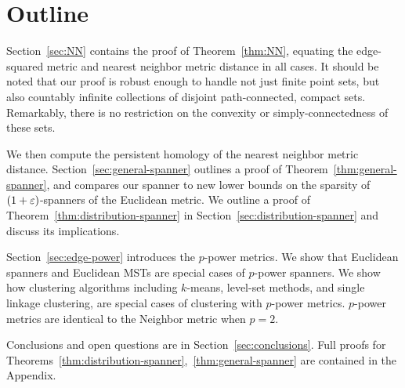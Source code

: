 \section{Outline}
%  
Section~\ref{sec:NN} contains the proof of Theorem~\ref{thm:NN},
equating the edge-squared metric and nearest neighbor metric distance in
all cases. It should be noted that our proof is robust enough to handle not
just finite point sets, but also countably infinite collections of disjoint
path-connected, compact sets. Remarkably, there is no restriction on the convexity or
simply-connectedness of these sets.

We then compute the persistent homology of the nearest neighbor metric
distance.  Section~\ref{sec:general-spanner} outlines a proof of
Theorem~\ref{thm:general-spanner}, and compares our spanner to new lower
bounds
on the sparsity of $(1+\varepsilon)$-spanners of the Euclidean metric.
We outline a proof of Theorem~\ref{thm:distribution-spanner} in
Section~\ref{sec:distribution-spanner} and discuss its implications.  

Section~\ref{sec:edge-power} introduces the $p$-power metrics. We show
that Euclidean spanners and Euclidean MSTs are special cases of
$p$-power spanners. We show how
clustering algorithms including $k$-means, level-set methods,
and single linkage clustering, are special cases of
clustering with $p$-power metrics. $p$-power metrics are identical to the
Neighbor metric when $p=2$.


Conclusions and open questions are in
Section~\ref{sec:conclusions}. Full proofs for
Theorems~\ref{thm:distribution-spanner},~\ref{thm:general-spanner}
are contained in the Appendix.
